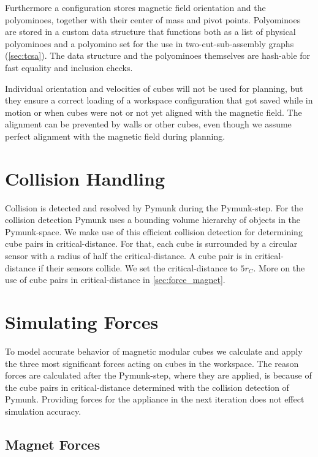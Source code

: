 Furthermore a configuration stores magnetic field orientation and the polyominoes, together with their center of mass and pivot points.
Polyominoes are stored in a custom data structure that functions both as a list of physical polyominoes and a polyomino set for the use in two-cut-sub-assembly graphs (\autoref{sec:tcsa}).
The data structure and the polyominoes themselves are hash-able for fast equality and inclusion checks.

Individual orientation and velocities of cubes will not be used for planning, but they ensure a correct loading of a workspace configuration that got saved while in motion or when cubes were not or not yet aligned with the magnetic field.
The alignment can be prevented by walls or other cubes, even though we assume perfect alignment with the magnetic field during planning.


\section{Collision Handling}
\label{sec:coll_handling}

Collision is detected and resolved by Pymunk during the Pymunk-step.
For the collision detection Pymunk uses a bounding volume hierarchy of objects in the Pymunk-space.
We make use of this efficient collision detection for determining cube pairs in critical-distance.
For that, each cube is surrounded by a circular sensor with a radius of half the critical-distance.
A cube pair is in critical-distance if their sensors collide.
We set the critical-distance to $5 r_C$.
More on the use of cube pairs in critical-distance in \autoref{sec:force_magnet}.

\section{Simulating Forces}

To model accurate behavior of magnetic modular cubes we calculate and apply the three most significant forces acting on cubes in the workspace.
The reason forces are calculated after the Pymunk-step, where they are applied, is because of the cube pairs in critical-distance determined with the collision detection of Pymunk.
Providing forces for the appliance in the next iteration does not effect simulation accuracy.

\subsection{Magnet Forces}
\label{sec:force_magnet}

